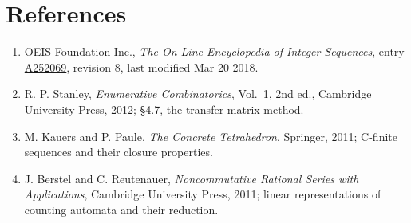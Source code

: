 \documentclass[11pt]{article}
\theoremstyle{definition}
\begin{document}
\section{References}

\begin{enumerate}

\item OEIS Foundation Inc., \emph{The On-Line Encyclopedia of Integer Sequences}, entry \href{https://oeis.org/A252069}{A252069}, revision 8, last modified Mar 20 2018.

\item R. P. Stanley, \emph{Enumerative Combinatorics}, Vol.~1, 2nd ed., Cambridge University Press, 2012; \S4.7, the transfer-matrix method.

\item M. Kauers and P. Paule, \emph{The Concrete Tetrahedron}, Springer, 2011; C-finite sequences and their closure properties.

\item J. Berstel and C. Reutenauer, \emph{Noncommutative Rational Series with Applications}, Cambridge University Press, 2011; linear representations of counting automata and their reduction.

\end{enumerate}
\end{document}
